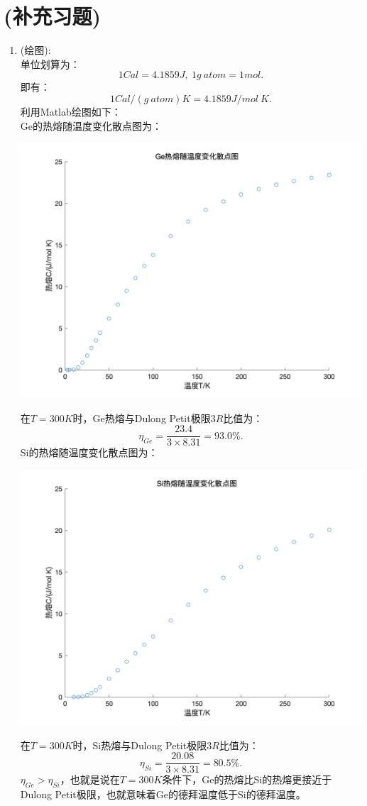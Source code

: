 \documentclass[reqno,a4paper,12pt]{amsart}
\begin{document}
\section{(补充习题)}
\begin{enumerate}
	\item (绘图): \\
	单位划算为：
	\[
		1Cal = 4.1859J, ~ 1g~atom = 1 mol.
	\]
	即有：
	\[
		1Cal/(g~atom)K = 4.1859J/mol~K.
	\]
	利用Matlab绘图如下： \\
	Ge的热熔随温度变化散点图为：\\
	\begin{center}
		\includegraphics[scale = 0.3]{Ge_C_T.png}
	\end{center}
	在$T = 300K$时，Ge热熔与Dulong Petit极限$3R$比值为：
	\[
		\eta_{Ge} = \frac{23.4}{3\times 8.31} = 93.0\%.
	\]
	Si的热熔随温度变化散点图为：\\
	\begin{center}
		\includegraphics[scale = 0.3]{Si_C_T.png}
	\end{center}
	在$T = 300K$时，Si热熔与Dulong Petit极限$3R$比值为：
	\[
		\eta_{Si} = \frac{20.08}{3\times 8.31} = 80.5\%.
	\]
	$\eta_{Ge} > \eta_{Si}$，也就是说在$T = 300K$条件下，Ge的热熔比Si的热熔更接近于Dulong Petit极限，也就意味着Ge的德拜温度低于Si的德拜温度。
	

\end{enumerate}
\end{document}
